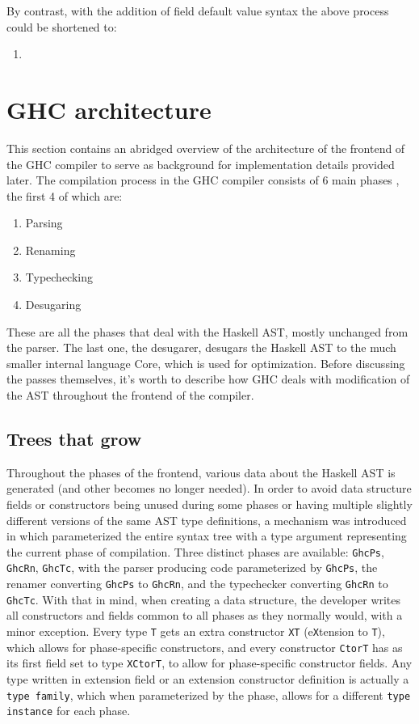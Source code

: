 \documentclass[en]{pracamgr}
\begin{document}
By contrast, with the addition of field default value syntax the above process could be shortened to:
\begin{enumerate}
  \item 
\end{enumerate}

\chapter{GHC architecture}
This section contains an abridged overview of the architecture of the frontend of the GHC compiler to serve as background for implementation details provided later.
The compilation process in the GHC compiler consists of 6 main phases \cite{GHCIntermediateForms}, the first 4 of which are:
\begin{enumerate}
  \item Parsing
  \item Renaming
  \item Typechecking 
  \item Desugaring 
\end{enumerate}
These are all the phases that deal with the Haskell AST, mostly unchanged from the parser. 
The last one, the desugarer, desugars the Haskell AST to the much smaller internal language Core, which is used for optimization.
Before discussing the passes themselves, it's worth to describe how GHC deals with modification of the AST throughout the frontend of the compiler.
\section{Trees that grow}
Throughout the phases of the frontend, various data about the Haskell AST is generated (and other becomes no longer needed).
In order to avoid data structure fields or constructors being unused during some phases or having multiple slightly different versions of the same AST type definitions,
a mechanism was introduced in \cite{Najd2017TreesTG} which parameterized the entire syntax tree with a type argument representing the current phase of compilation.
Three distinct phases are available: \texttt{GhcPs}, \texttt{GhcRn}, \texttt{GhcTc},
with the parser producing code parameterized by \texttt{GhcPs}, the renamer converting \texttt{GhcPs} to \texttt{GhcRn},
and the typechecker converting \texttt{GhcRn} to \texttt{GhcTc}. 
With that in mind, when creating a data structure,
the developer writes all constructors and fields common to all phases as they normally would, with a minor exception.
Every type \texttt{T} gets an extra constructor \texttt{XT} (e\texttt{X}tension to \texttt{T}), which allows for phase-specific constructors,
and every constructor \texttt{CtorT} has as its first field set to type \texttt{XCtorT}, to allow for phase-specific constructor fields.
Any type written in extension field or an extension constructor definition is actually a \texttt{type family},
which when parameterized by the phase, allows for a different \texttt{type instance} for each phase.
\end{document}
